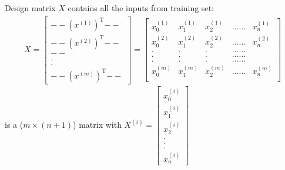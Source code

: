 \documentclass[a4paper,12pt]{report}
\begin{document}
Design matrix $X$ contains all the inputs from training set:
\begin{align*}
			X = \begin{bmatrix} \mathrm{--} (x^{(1)})^{\mathrm{T}} \mathrm{--} \\ \mathrm{--} (x^{(2)})^{\mathrm{T}} \mathrm{--} \\ \mathrm{--}\\ . \\ . \\ \mathrm{--} (x^{(m)})^{\mathrm{T}} \mathrm{--} \end{bmatrix} = 
			\begin{bmatrix} 
						x_0 ^{(1)} & x_1 ^{(1)} & x_2 ^{(1)} & ......& x_n ^{(1)} \\
						x_0 ^{(2)} & x_1 ^{(2)} & x_2 ^{(2)} & ......& x_n ^{(2)} \\
						. & . & . & ......&  \\
						. & . & . & ......&  \\
						. & . & . & ......&  \\
						x_0^{(m)} & x_1 ^{(m)} & x_2 ^{(m)} & ......& x_n ^{(m)} \\
			\end{bmatrix}
\end{align*}
is a ($m \times (n+1)$) matrix with $X^{(i)} = \left[\begin{smallmatrix} x_0 ^{(i)} \\ x_1 ^{(i)}\\x_2 ^{(i)}\\.\\.\\.\\x_n ^{(i)}
 \end{smallmatrix} \right]$ 
\end{document}
